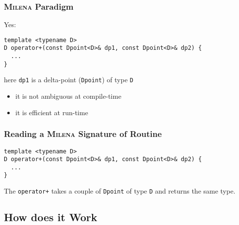 \documentclass{beamer}
\newcommand{\code}[1]{{\scriptsize{\texttt{#1}}}\xspace}
\newcommand{\mln}{\textsc{Milena}\xspace}
\begin{document}
\begin{frame}[fragile]
  \frametitle{\mln Paradigm}

Yes:

\begin{lstlisting}
template <typename D>
D operator+(const Dpoint<D>& dp1, const Dpoint<D>& dp2) {
  ...
}
\end{lstlisting}

\begin{center}
  here \code{dp1} is a delta-point (\code{Dpoint}) of type \code{D}
\end{center}

\medskip

\begin{itemize}
\item it is not ambiguous at compile-time
\item it is efficient at run-time\\
  \scriptsize{}
\end{itemize}

\end{frame}


\begin{frame}[fragile]
  \frametitle{Reading a \mln Signature of Routine}

\begin{lstlisting}
template <typename D>
D operator+(const Dpoint<D>& dp1, const Dpoint<D>& dp2) {
  ...
}
\end{lstlisting}

\medskip

\begin{center}
  The \code{operator+} takes a couple of \code{Dpoint} of type
  \code{D} and returns the same type.
\end{center}

\end{frame}



\subsection{How does it Work}
\end{document}
